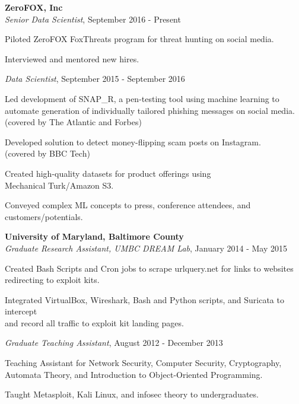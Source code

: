 \medskip
\atab \textbf{ZeroFOX, Inc}\\
\btab \textit{Senior Data Scientist}, September 2016 - Present\\
\begin{my_list}
\item Piloted ZeroFOX FoxThreats program for threat hunting on social media.
\item Interviewed and mentored new hires.
\end{my_list}
\btab \textit{Data Scientist}, September 2015 - September 2016\\
\begin{my_list}
\item Led development of SNAP\_R, a pen-testing tool using machine learning to\\ \tab \tab automate generation of individually tailored phishing messages on social media.\\ \tab \tab(covered by The Atlantic and Forbes)
\item Developed solution to detect money-flipping scam posts on Instagram.\\ \tab \tab (covered by BBC Tech)
\item Created high-quality datasets for product offerings using\\ \tab \tab Mechanical Turk/Amazon S3.
\item Conveyed complex ML concepts to press, conference attendees, and\\ \tab \tab customers/potentials.
\end{my_list}

\medskip
\atab \textbf{University of Maryland, Baltimore County}\\
\btab \textit{Graduate Research Assistant, UMBC DREAM Lab}, January 2014 - May 2015\\
\begin{my_list}
\item Created Bash Scripts and Cron jobs to scrape urlquery.net for links to websites\\ \tab \tab redirecting to exploit kits.
\item Integrated VirtualBox, Wireshark, Bash and Python scripts, and Suricata to intercept\\ \tab \tab and record all traffic to exploit kit landing pages.
\end{my_list}

\btab \textit{Graduate Teaching Assistant}, August 2012 - December 2013\\
\begin{my_list}
\item Teaching Assistant for Network Security, Computer Security, Cryptography,\\ \tab \tab Automata Theory, and Introduction to Object-Oriented Programming.
\item Taught Metasploit, Kali Linux, and infosec theory to undergraduates.
\end{my_list}

